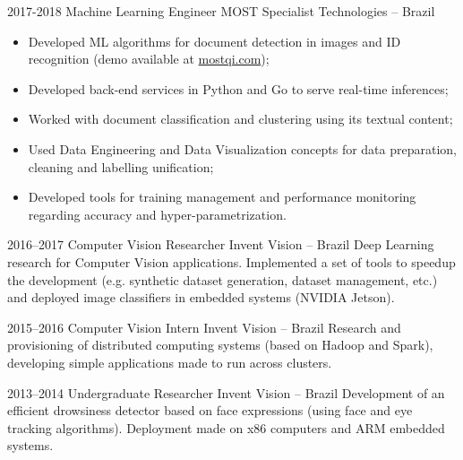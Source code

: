 \documentclass[a4paper]{cv-friggeri-x}
\begin{document}
\begin{entrylist}
\entry
    {2017-2018}
    {Machine Learning Engineer}
    {MOST Specialist Technologies -- Brazil}
    {\begin{itemize}
        \item Developed ML algorithms for document detection in images and ID recognition (demo available at \href{mostqi.com}{mostqi.com});
        \item Developed back-end services in Python and Go to serve real-time inferences;
        \item Worked with document classification and clustering using its textual content;
        \item Used Data Engineering and Data Visualization concepts for data preparation, cleaning and labelling unification;
        \item Developed tools for training management and performance monitoring regarding accuracy and hyper-parametrization.
    \end{itemize}}






\entry
    {2016--2017}
    {Computer Vision Researcher}%
    {Invent Vision -- Brazil}
    {Deep Learning research for Computer Vision applications. Implemented a set of tools to speedup the development (e.g. synthetic dataset generation, dataset management, etc.) and deployed image classifiers in embedded systems (NVIDIA Jetson).}

\entry
    {2015--2016}
    {Computer Vision Intern}
    {Invent Vision -- Brazil}
    {Research and provisioning of distributed computing systems (based on Hadoop and Spark), developing simple applications made to run across clusters.}

\entry
    {2013--2014}
    {Undergraduate Researcher}
    {Invent Vision -- Brazil}
    {Development of an efficient drowsiness detector based on face expressions (using face and eye tracking algorithms). Deployment made on x86 computers and ARM embedded systems.}



\end{entrylist}
\end{document}
